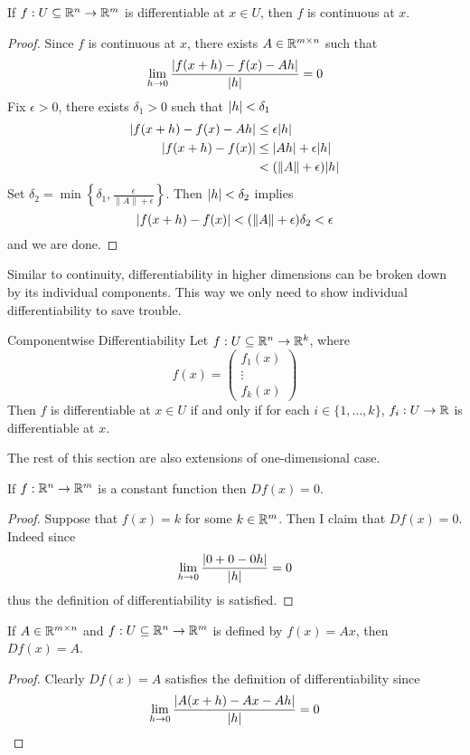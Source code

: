 \documentclass[a4paper]{article}
\begin{document}
\begin{prp}{}{} If $f:U\subseteq\mathbb{R}^n\to\mathbb{R}^m$ is differentiable at $x\in U$, then $f$ is continuous at $x$. 
\begin{proof}
Since $f$ is continuous at $x$, there exists $A\in\mathbb{R}^{m\times n}$ such that $$\lim_{h\to 0}\frac{\abs{f(x+h)-f(x)-Ah}}{\abs{h}}=0$$ Fix $\epsilon>0$, there exists $\delta_1>0$ such that $\abs{h}<\delta_1$ 
\begin{align*}
\abs{f(x+h)-f(x)-Ah}&\leq\epsilon\abs{h}\\
\abs{f(x+h)-f(x)}&\leq\abs{Ah}+\epsilon\abs{h}\\
&<(\|A\|+\epsilon)\abs{h}
\end{align*}
Set $\delta_2=\min\left\{\delta_1,\frac{\epsilon}{\|A\|+\epsilon}\right\}$. Then $\abs{h}<\delta_2$ implies $$\abs{f(x+h)-f(x)}<(\|A\|+\epsilon)\delta_2<\epsilon$$ and we are done. 
\end{proof}
\end{prp}

Similar to continuity, differentiability in higher dimensions can be broken down by its individual components. This way we only need to show individual differentiability to save trouble. 

\begin{prp}{Componentwise Differentiability}{} Let $f:U\subseteq\mathbb{R}^n\to\mathbb{R}^k$, where $$f(x)=\begin{pmatrix}f_1(x)\\\vdots\\f_k(x)\end{pmatrix}$$ Then $f$ is differentiable at $x\in U$ if and only if for each $i\in\{1,\dots,k\}$, $f_i:U\to\mathbb{R}$ is differentiable at $x$. 
\end{prp}

The rest of this section are also extensions of one-dimensional case. 

\begin{prp}{}{} If $f:\mathbb{R}^n\to\mathbb{R}^m$ is a constant function then $Df(x)=0$. 
\begin{proof}
Suppose that $f(x)=k$ for some $k\in\mathbb{R}^m$. Then I claim that $Df(x)=0$. Indeed since $$\lim_{h\to 0}\frac{\abs{0+0-0h}}{\abs{h}}=0$$ thus the definition of differentiability is satisfied. 
\end{proof}
\end{prp}

\begin{prp}{}{} If $A\in\mathbb{R}^{m\times n}$ and $f:U\subseteq\mathbb{R}^n\to\mathbb{R}^m$ is defined by $f(x)=Ax$, then $Df(x)=A$. 
\begin{proof}
Clearly $Df(x)=A$ satisfies the definition of differentiability since $$\lim_{h\to 0}\frac{\abs{A(x+h)-Ax-Ah}}{\abs{h}}=0$$
\end{proof}
\end{prp}
\end{document}
